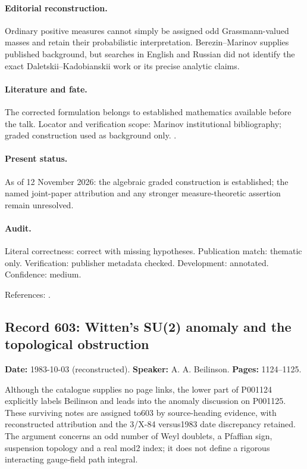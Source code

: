 \paragraph{Editorial reconstruction.} Ordinary positive measures cannot simply be assigned odd Grassmann-valued masses and retain their probabilistic interpretation. Berezin--Marinov supplies published background, but searches in English and Russian did not identify the exact Daletskii--Kadobianskii work or its precise analytic claims.

\paragraph{Literature and fate.} The corrected formulation belongs to established mathematics available before the talk. Locator and verification scope: Marinov institutional bibliography; graded construction used as background only. \cite{berezinmarinov1977particle}.

\paragraph{Present status.} As of 12 November 2026: the algebraic graded construction is established; the named joint-paper attribution and any stronger measure-theoretic assertion remain unresolved.

\paragraph{Audit.} Literal correctness: correct with missing hypotheses. Publication match: thematic only. Verification: publisher metadata checked. Development: annotated. Confidence: medium.

\noindent References: \citep{berezinmarinov1977particle}.\par

\subsection{Record 603: Witten's SU(2) anomaly and the topological obstruction}

\label{talk:603}

\noindent\textbf{Date:} 1983-10-03 (reconstructed). \textbf{Speaker:} A. A. Beilinson. \textbf{Pages:} 1124--1125.\par

Although the catalogue supplies no page links, the lower part of P001124 explicitly labels Beilinson and leads into the anomaly discussion on P001125. These surviving notes are assigned to603 by source-heading evidence, with reconstructed attribution and the 3/X-84 versus1983 date discrepancy retained. The argument concerns an odd number of Weyl doublets, a Pfaffian sign, suspension topology and a real mod2 index; it does not define a rigorous interacting gauge-field path integral.

